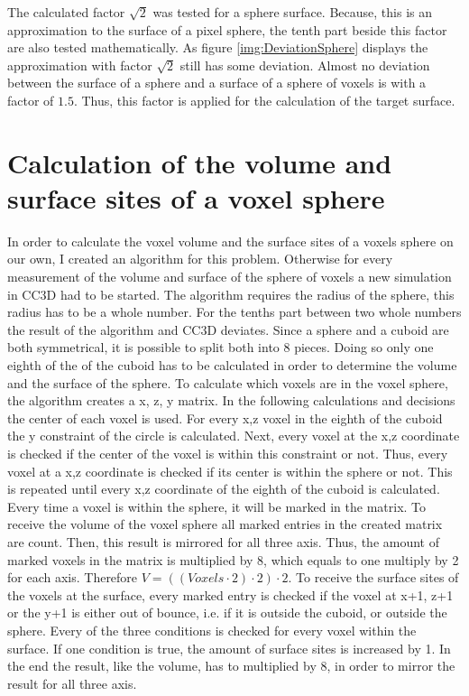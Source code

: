 The calculated factor $\sqrt{2}$ was tested for a sphere surface. Because, this is an approximation to the surface of a pixel sphere, the tenth part beside this factor are also tested mathematically. As figure \ref{img:DeviationSphere} displays the  approximation with factor $\sqrt{2}$ still has some deviation. Almost no deviation between the surface of a sphere and a surface of a sphere of voxels is with a factor of $1.5$. Thus, this factor is applied for the calculation of the target surface. 

\section{Calculation of the volume and surface sites of a voxel sphere}
In order to calculate the voxel volume and the surface sites of a voxels sphere on our own, I created an algorithm for this problem. Otherwise for every measurement of the volume and surface of the sphere of voxels a new simulation in \ac{CC3D} had to be started. \newline
The algorithm requires the radius of the sphere, this radius has to be a whole number. For the tenths part between two whole numbers the result of the algorithm and \ac{CC3D} deviates.
Since a sphere and a cuboid are both symmetrical, it is possible to split both into 8 pieces. Doing so only one eighth of the of the cuboid has to be calculated in order to determine the volume and the surface of the sphere. \newline
To calculate which voxels are in the voxel sphere, the algorithm creates a x, z, y matrix. In the following calculations and decisions the center of each voxel is used. For every x,z voxel in the eighth of the cuboid the y constraint of the circle is calculated. Next, every voxel at the x,z coordinate is checked if the center of the voxel is within this constraint or not. Thus, every voxel at a x,z coordinate is checked if its center is within the sphere or not. This is repeated until every x,z coordinate of the eighth of the cuboid is calculated. Every time a voxel is within the sphere, it will be marked in the matrix.  \newline
To receive the volume of the voxel sphere all marked entries in the created matrix are count. Then, this result is mirrored for all three axis. Thus, the amount of marked voxels in the matrix is multiplied by 8, which equals to one multiply by 2 for each axis. Therefore $V=((Voxels \cdot 2) \cdot 2) \cdot 2$.
To receive the surface sites of the voxels at the surface, every marked entry is checked if the voxel at x+1, z+1 or the y+1 is either out of bounce, i.e. if it is outside the cuboid, or outside the sphere. Every of the three conditions is checked for every voxel within the surface. If one condition is true, the amount of surface sites is increased by 1. In the end the result, like the volume, has to multiplied by 8, in order to mirror the result for all three axis.


